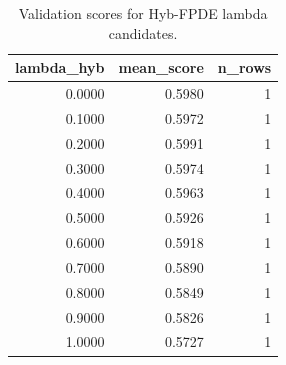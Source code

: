 \begin{table}[t]
\caption{Validation scores for Hyb-FPDE lambda candidates.}
\label{tab:lambda_distribution_computed}
\centering
\begin{tabular}{rrr}
\toprule
lambda\_hyb & mean\_score & n\_rows \\
\midrule
0.0000 & 0.5980 & 1 \\
0.1000 & 0.5972 & 1 \\
0.2000 & 0.5991 & 1 \\
0.3000 & 0.5974 & 1 \\
0.4000 & 0.5963 & 1 \\
0.5000 & 0.5926 & 1 \\
0.6000 & 0.5918 & 1 \\
0.7000 & 0.5890 & 1 \\
0.8000 & 0.5849 & 1 \\
0.9000 & 0.5826 & 1 \\
1.0000 & 0.5727 & 1 \\
\bottomrule
\end{tabular}

\end{table}
